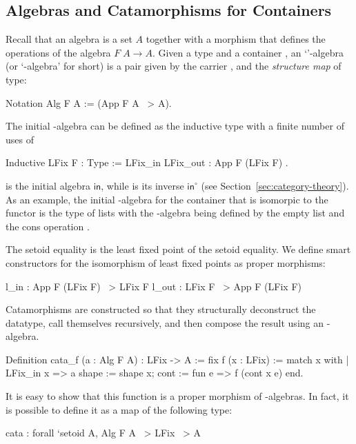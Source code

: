 \documentclass[a4paper,anonymous, UKenglish,cleveref, autoref, thm-restate]{lipics-v2021}
\newcommand{\operator}[1]{\textsf{#1}}
\newcommand{\InOp}{\operator{in}^{\circ}}
\newcommand{\InIso}{\operator{in}}
\begin{document}
\subsection{Algebras and Catamorphisms for Containers}
\label{sec:coq-algebras}

Recall that an algebra is a set $A$ together with a morphism that defines the
operations of the algebra $F\;A \to A$.  Given a type  and a container
, an `'-algebra (or `-algebra' for short) is a pair
given by the carrier , and the \emph{structure map} of type:
\begin{coqcode}
Notation Alg F A := (App F A ~> A).
\end{coqcode}
The initial -algebra can be defined as the inductive type with a finite
number of uses of 
\begin{coqcode}
Inductive LFix F : Type := LFix_in { LFix_out : App F (LFix F) }.
\end{coqcode}
 is the initial algebra $\InIso$, while  is its
inverse $\InOp$ (see Section~\ref{sec:category-theory}).  As an example, the
initial -algebra for the container that is isomorpic to the functor
 is the type of lists with the -algebra being
defined by the empty list  and the cons operation
.

The  setoid equality is the least fixed point of the 
setoid equality. We define smart constructors for the isomorphism of least fixed
points as proper morphisms:
\begin{coqcode}
l_in : App F (LFix F) ~> LFix F         l_out : LFix F ~> App F (LFix F)
\end{coqcode}

Catamorphisms are constructed so that they structurally deconstruct the
datatype, call themselves recursively, and then compose the result using an
-algebra.
\begin{coqcode}
Definition cata_f (a : Alg F A) : LFix -> A
  := fix f (x : LFix) := match x with
        | LFix_in x => a {shape := shape x; cont := fun e => f (cont x e)}
        end.
\end{coqcode}

It is easy to show that this function is a proper morphism of -algebras.
In fact, it is possible to define it as a map of the following type:
\begin{coqcode}
  cata : forall `{setoid A}, Alg F A ~> LFix ~> A
\end{coqcode}
\end{document}
